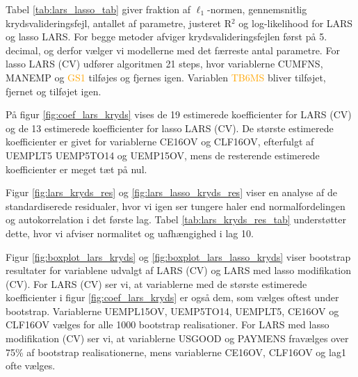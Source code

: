 
Tabel \ref{tab:lars_lasso_tab} giver fraktion af \(\ell_1\)-normen, gennemsnitlig krydsvalideringsfejl, antallet af parametre, justeret R$^2$ og log-likelihood for LARS og lasso LARS.
For begge metoder afviger krydsvalideringsfejlen først på 5. decimal, og derfor vælger vi modellerne med det færreste antal parametre. 
For lasso LARS (CV) udfører algoritmen 21 steps, hvor variablerne  \textcolor{chartreuse4}{CUMFNS}, \textcolor{blue3}{MANEMP} og \textcolor{orange}{GS1} tilføjes og fjernes igen. 
Variablen \textcolor{orange}{TB6MS} bliver tilføjet, fjernet og tilføjet igen.  

%

%
På figur \ref{fig:coef_lars_kryds} vises de 19 estimerede koefficienter for LARS (CV) og de 13 estimerede koefficienter for lasso LARS (CV). 
De største estimerede koefficienter er givet for variablerne \textcolor{blue3}{CE16OV} og \textcolor{blue3}{CLF16OV}, efterfulgt af \textcolor{blue3}{UEMPLT5} \textcolor{blue3}{UEMP5TO14} og \textcolor{blue3}{UEMP15OV}, mens de resterende estimerede koefficienter er meget tæt på nul.



Figur \ref{fig:lars_kryds_res} og \ref{fig:lars_lasso_kryds_res} viser en analyse af de standardiserede residualer, hvor vi igen ser tungere haler end normalfordelingen og autokorrelation i det første lag. 
Tabel \ref{tab:lars_kryds_res_tab} understøtter dette, hvor vi afviser normalitet og uafhængighed i lag 10. 

Figur \ref{fig:boxplot_lars_kryds} og  \ref{fig:boxplot_lars_lasso_kryds} viser bootstrap resultater for variablene udvalgt af LARS (CV) og LARS med lasso modifikation (CV). 
For LARS (CV) ser vi, at variablerne med de største estimerede koefficienter i figur \ref{fig:coef_lars_kryds} er også dem, som vælges oftest under bootstrap. 
Variablerne \textcolor{blue3}{UEMPL15OV}, \textcolor{blue3}{UEMP5TO14}, \textcolor{blue3}{UEMPLT5}, \textcolor{blue3}{CE16OV} og \textcolor{blue3}{CLF16OV} vælges for alle 1000 bootstrap realisationer.
For LARS med lasso modifikation (CV)  ser vi, at variablerne \textcolor{blue3}{USGOOD} og \textcolor{blue3}{PAYMENS} fravælges over 75\% af bootstrap realisationerne, mens variablerne \textcolor{blue3}{CE16OV}, \textcolor{blue3}{CLF16OV} og \textcolor{blue3}{lag1} ofte vælges. 

